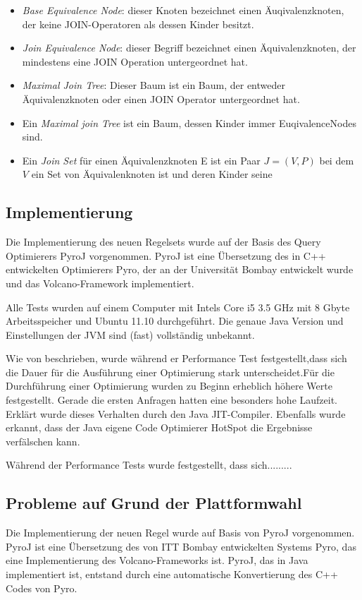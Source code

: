 \begin{itemize}
\item \textit{Base Equivalence Node}: dieser Knoten bezeichnet einen Äuqivalenzknoten, der keine JOIN-Operatoren als dessen Kinder besitzt.
\item \textit{Join Equivalence Node}: dieser Begriff bezeichnet einen Äquivalenzknoten, der mindestens eine JOIN Operation untergeordnet hat.
\item \textit{Maximal Join Tree}: Dieser Baum ist ein Baum, der entweder Äquivalenzknoten oder einen JOIN Operator untergeordnet hat.
\item Ein \textit{Maximal join Tree} ist ein Baum, dessen Kinder immer EuqivalenceNodes sind.
\item Ein \textit{Join Set} für einen Äquivalenzknoten E ist ein Paar $J = (V, P)$ bei dem $V$ ein Set von Äquivalenknoten ist und deren Kinder seine 
\end{itemize}


\subsection{Implementierung}
Die Implementierung des neuen Regelsets wurde auf der Basis des Query Optimierers PyroJ vorgenommen. PyroJ ist eine Übersetzung des in C++ entwickelten Optimierers Pyro, der an der Universität Bombay entwickelt wurde und das Volcano-Framework implementiert.

Alle Tests wurden auf einem Computer mit Intels Core i5 3.5 GHz mit 8 Gbyte Arbeitsspeicher und Ubuntu 11.10 durchgeführt. Die genaue Java Version und Einstellungen der JVM sind (fast) vollständig unbekannt.

Wie von \cite{shanbhag2014optimizing} beschrieben, wurde während er Performance Test festgestellt,dass sich die Dauer für die Ausführung einer Optimierung stark unterscheidet.Für die Durchführung einer Optimierung wurden zu Beginn erheblich höhere Werte festgestellt. Gerade die ersten Anfragen hatten eine besonders hohe Laufzeit. Erklärt wurde dieses Verhalten durch den Java \ac{JIT}-Compiler. Ebenfalls wurde erkannt, dass der Java eigene Code Optimierer HotSpot die Ergebnisse verfälschen kann. 

Während der Performance Tests wurde festgestellt, dass sich.........


\subsection{Probleme auf Grund der Plattformwahl}
Die Implementierung der neuen Regel wurde auf Basis von PyroJ vorgenommen. PyroJ ist eine Übersetzung des von ITT Bombay entwickelten Systems Pyro, das eine Implementierung des Volcano-Frameworks ist. PyroJ, das in Java implementiert ist, entstand durch eine automatische Konvertierung des C++ Codes von Pyro. 

